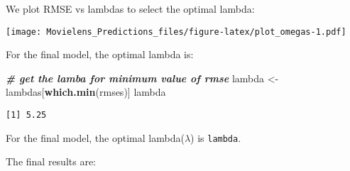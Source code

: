 \documentclass[
]{article}
\newenvironment{Shaded}{\begin{snugshade}}{\end{snugshade}}
\newcommand{\CommentTok}[1]{\textcolor[rgb]{0.00,0.40,1.00}{\textbf{\textit{#1}}}}
\newcommand{\DataTypeTok}[1]{\textcolor[rgb]{0.74,0.68,0.62}{\underline{#1}}}
\newcommand{\KeywordTok}[1]{\textcolor[rgb]{0.26,0.66,0.93}{\textbf{#1}}}
\newcommand{\NormalTok}[1]{\textcolor[rgb]{0.74,0.68,0.62}{#1}}
\newcommand{\OperatorTok}[1]{\textcolor[rgb]{0.74,0.68,0.62}{#1}}
\newcommand{\StringTok}[1]{\textcolor[rgb]{0.02,0.61,0.04}{#1}}
\begin{document}
We plot RMSE vs lambdas to select the optimal lambda:

\begin{Shaded}
\end{Shaded}

\texttt{[image: Movielens\_Predictions\_files/figure-latex/plot\_omegas-1.pdf]}

For the final model, the optimal lambda is:

\begin{Shaded}
\begin{Highlighting}[]
\CommentTok{# get the lamba for minimum value of rmse}
\NormalTok{lambda <-}\StringTok{ }\NormalTok{lambdas[}\KeywordTok{which.min}\NormalTok{(rmses)]}
\NormalTok{lambda}
\end{Highlighting}
\end{Shaded}

\begin{verbatim}
[1] 5.25
\end{verbatim}

For the final model, the optimal lambda(\(\lambda\)) is \texttt{lambda}.

The final results are:

\begin{Shaded}
\end{Shaded}
\end{document}
